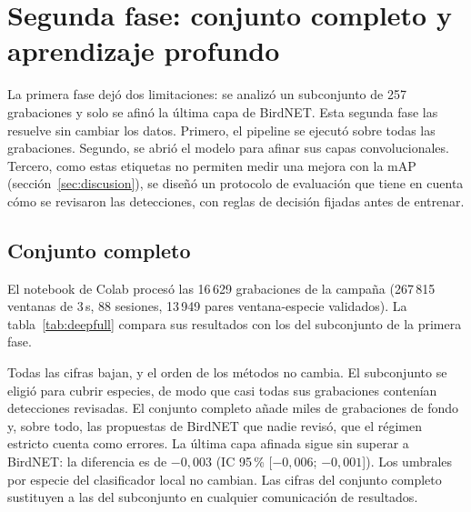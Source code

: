 \section{Segunda fase: conjunto completo y aprendizaje profundo}\label{sec:fase2}
La primera fase dejó dos limitaciones: se analizó un subconjunto de 257 grabaciones y solo se afinó la última capa de BirdNET.
Esta segunda fase las resuelve sin cambiar los datos. Primero, el pipeline se ejecutó sobre todas las grabaciones. Segundo, se abrió el modelo
para afinar sus capas convolucionales. Tercero, como estas etiquetas no permiten medir una mejora con la mAP (sección~\ref{sec:discusion}),
se diseñó un protocolo de evaluación que tiene en cuenta cómo se revisaron las detecciones, con reglas de decisión fijadas antes de entrenar.

\subsection{Conjunto completo}\label{sec:completo}
El notebook de Colab procesó las 16\,629 grabaciones de la campaña (267\,815 ventanas de 3\,s, 88 sesiones, 13\,949 pares ventana-especie
validados). La tabla~\ref{tab:deepfull} compara sus resultados con los del subconjunto de la primera fase.

\begin{table}[H]
  \centering\small
  \caption{mAP macro de la primera fase (subconjunto) y del conjunto completo, con la misma validación cruzada agrupada por sesión.
  La última columna es la estimación obtenida con la muestra estratificada de la sección~\ref{sec:muestra}.}\label{tab:deepfull}
\end{table}

Todas las cifras bajan, y el orden de los métodos no cambia. El subconjunto se eligió para cubrir especies, de modo que casi todas sus
grabaciones contenían detecciones revisadas. El conjunto completo añade miles de grabaciones de fondo y, sobre todo, las propuestas de BirdNET
que nadie revisó, que el régimen estricto cuenta como errores. La última capa afinada sigue sin superar a BirdNET: la diferencia es de
$-0{,}003$ (IC 95\,\% [$-0{,}006$; $-0{,}001$]). Los umbrales por especie del clasificador local no cambian. Las cifras del conjunto completo
sustituyen a las del subconjunto en cualquier comunicación de resultados.

